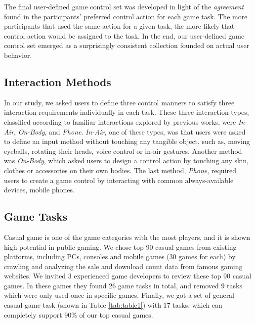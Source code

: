\documentclass{sigchi}
\begin{document}
    The final user-defined game control set was developed in light of the \textsl{agreement} found in the participants' preferred control action for each game task\cite{Wobbrock:2005:MGS:1056808.1057043}. The more participants that used the same action for a given task, the more likely that control action would be assigned to the task. In the end, our user-defined game control set emerged as a surprisingly consistent collection founded on actual user behavior.

    \subsection {Interaction Methods}
    In our study, we asked users to define three control manners to satisfy three interaction requirements individually in each task. These three interaction types, classified according to familiar interactions explored by previous works, were \textsl{In-Air}, \textsl{On-Body}, and \textsl{Phone}. \textsl{In-Air}, one of these types, was that users were asked to define an input method without touching any tangible object, such as, moving eyeballs, rotating their heads, voice control or in-air gestures. Another method was \textsl{On-Body}, which asked users to design a control action by touching any skin, clothes or accessories on their own bodies. The last method, \textsl{Phone}, required users to create a game control by interacting with common always-available devices, mobile phones.    

    \subsection {Game Tasks}
    Casual game is one of the game categories with the most players\cite{esa_ef_2014}, and it is shown high potential in public gaming\cite{Jurgelionis:2011:PET:2027456.2027462,Reis:2012:EMC:2405577.2405651,Biskupski:2014:DEB:2559206.2580097}. We chose top 90 casual games\cite{TopGames} from existing platforms, including PCs, consoles and mobile games (30 games for each) by crawling and analyzing the sale and download count data from famous gaming websites\cite{appannie,VGChartz,Steam,GameStop}. We invited 3 experienced game developers to review these top 90 casual games. In these games they found 26 game tasks in total, and removed 9 tasks which were only used once in specific games. Finally, we got a set of general casual game task (shown in Table \ref{tab:table1}) with 17 tasks, which can completely support 90\% of our top casual games. 
\end{document}
